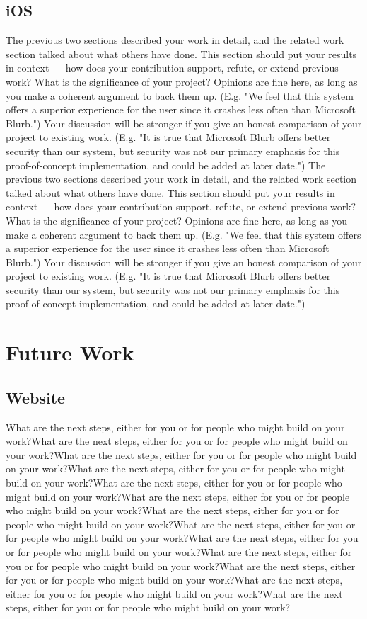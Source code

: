 \documentclass{acm_proc_article-sp}
\begin{document}
\subsection{iOS}
The previous two sections described your work in detail, and the related work section talked about what others have done. This section should put your results in context — how does your contribution support, refute, or extend previous work? What is the significance of your project? Opinions are fine here, as long as you make a coherent argument to back them up. (E.g. "We feel that this system offers a superior experience for the user since it crashes less often than Microsoft Blurb.") Your discussion will be stronger if you give an honest comparison of your project to existing work. (E.g. "It is true that Microsoft Blurb offers better security than our system, but security was not our primary emphasis for this proof-of-concept implementation, and could be added at later date.") The previous two sections described your work in detail, and the related work section talked about what others have done. This section should put your results in context — how does your contribution support, refute, or extend previous work? What is the significance of your project? Opinions are fine here, as long as you make a coherent argument to back them up. (E.g. "We feel that this system offers a superior experience for the user since it crashes less often than Microsoft Blurb.") Your discussion will be stronger if you give an honest comparison of your project to existing work. (E.g. "It is true that Microsoft Blurb offers better security than our system, but security was not our primary emphasis for this proof-of-concept implementation, and could be added at later date.")


\section{Future Work}
\subsection{Website}
What are the next steps, either for you or for people who might build on your work?What are the next steps, either for you or for people who might build on your work?What are the next steps, either for you or for people who might build on your work?What are the next steps, either for you or for people who might build on your work?What are the next steps, either for you or for people who might build on your work?What are the next steps, either for you or for people who might build on your work?What are the next steps, either for you or for people who might build on your work?What are the next steps, either for you or for people who might build on your work?What are the next steps, either for you or for people who might build on your work?What are the next steps, either for you or for people who might build on your work?What are the next steps, either for you or for people who might build on your work?What are the next steps, either for you or for people who might build on your work?What are the next steps, either for you or for people who might build on your work?
\end{document}
